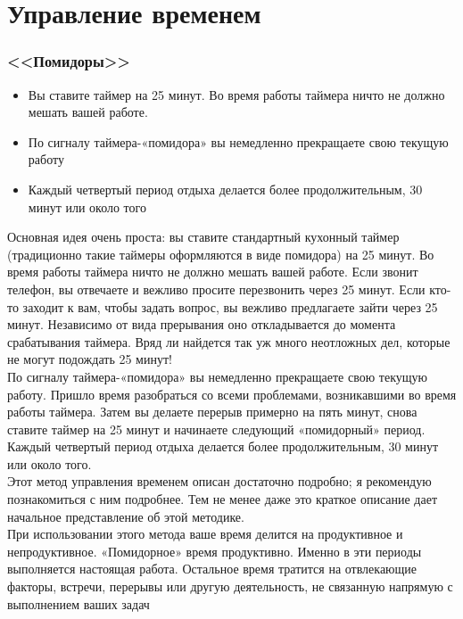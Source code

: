 \documentclass{../industrial-development}
\begin{document}
\section{Управление временем}

\begin{frame} \frametitle{<<Помидоры>>}
\begin{itemize}
  \item Вы ставите таймер  на 25 минут. Во время работы таймера ничто не должно мешать вашей работе.
	\item По сигналу таймера-«помидора» вы немедленно прекращаете свою текущую работу
	\item Каждый четвертый период отдыха делается более продолжительным, 30 минут или около того
\end{itemize}
\end{frame}
\lecturenotes
Основная идея очень проста: вы ставите стандартный кухонный таймер (традиционно такие таймеры оформляются в виде помидора) на 25 минут. Во время работы таймера ничто не должно мешать вашей работе. Если звонит телефон, вы отвечаете и вежливо просите перезвонить через 25 минут. Если кто-то заходит к вам, чтобы задать вопрос, вы вежливо предлагаете зайти через 25 минут. Независимо от вида прерывания оно откладывается до момента срабатывания таймера. Вряд ли найдется так уж много неотложных дел, которые не могут подождать 25 минут!\\
По сигналу таймера-«помидора» вы немедленно прекращаете свою текущую работу. Пришло время разобраться со всеми проблемами, возникавшими во время работы таймера. Затем вы делаете перерыв примерно на пять минут, снова ставите таймер на 25 минут и начинаете следующий «помидорный» период. Каждый четвертый период отдыха делается более продолжительным, 30 минут или около того.\\
Этот метод управления временем описан достаточно подробно; я рекомендую познакомиться с ним подробнее. Тем не менее даже это краткое описание дает начальное представление об этой методике.\\
При использовании этого метода ваше время делится на продуктивное и непродуктивное. «Помидорное» время продуктивно. Именно в эти периоды выполняется настоящая работа. Остальное время тратится на отвлекающие факторы, встречи, перерывы или другую деятельность, не связанную напрямую с выполнением ваших задач
\end{document}
